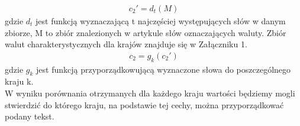 \documentclass{classrep}
\begin{document}
\begin{enumerate}
	\begin{gather}
	    c_2' = d_{t}(M)
	\end{gather} 
    \indent gdzie $d_{t}$ jest funkcją wyznaczającą t najczęściej występujących słów w danym zbiorze, M to zbiór znalezionych w artykule słów oznaczających waluty. Zbiór walut charakterystycznych dla krajów znajduje się w Załączniku 1.
    \begin{gather}
        c_2 = g_k(c_2')
    \end{gather}
    \indent gdzie $g_k$ jest funkcją przyporządkowującą wyznaczone słowa do poszczególnego kraju k.\\
    W wyniku porównania otrzymanych dla każdego kraju wartości będziemy mogli stwierdzić do którego kraju, na podstawie tej cechy, można przyporządkować podany tekst.\\
    

\end{enumerate}
\end{document}
